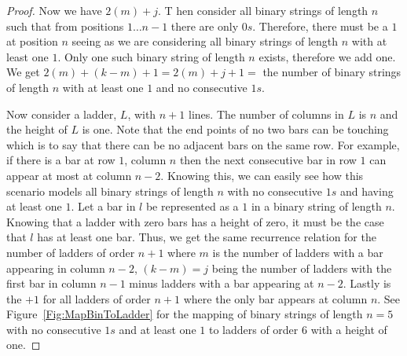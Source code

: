 \begin{proof}
    Now we have $2(m)+j$. T
    hen consider all binary strings of length $n$ such that from positions $1\dots n-1$ there are 
    only $0s$. Therefore, there must be a $1$ at position $n$ seeing as we are considering all binary strings of length $n$ with at least one $1$. 
    Only one such binary string of length $n$ exists, therefore we add one. We get $2(m)+(k-m)+1=2(m)+j+1=$ 
    the number of binary strings of length $n$ with at least one $1$ and 
    no consecutive $1s$.\par 
    Now consider a ladder, $L$, with $n+1$ lines. The number of columns in $L$ is $n$ and the height of $L$ is one. Note that the end points 
    of no two bars can be touching which is to say that there can be no adjacent bars on the same row. For example, 
    if there is a bar at row $1$, column $n$ then 
    the next consecutive bar in row $1$ can appear at most at column $n-2$. 
    Knowing this, we can easily see how this scenario models all binary strings of length $n$ with no 
    consecutive $1s$ and having at least one $1$. Let a bar in $l$ be represented as a $1$ in a binary string of length $n$. 
    Knowing that a ladder with zero bars has a height of zero, it must be the case that $l$ has at least one bar. 
    Thus, we get the same recurrence relation for the number of 
    ladders of order $n+1$ where $m$ is the number of ladders with a bar appearing in column $n-2$, $(k-m)=j$ 
    being the number of ladders with the first bar in column $n-1$ minus 
    ladders with a bar appearing at $n-2$. Lastly is the $+1$ for all ladders of order $n+1$ where the only bar appears at column $n$.
    See Figure~\ref{Fig:MapBinToLadder} for the mapping of binary strings of length $n=5$ with no consecutive $1s$ and at 
    least one $1$ to ladders of order $6$ with a height of one.\pagebreak

\end{proof}


